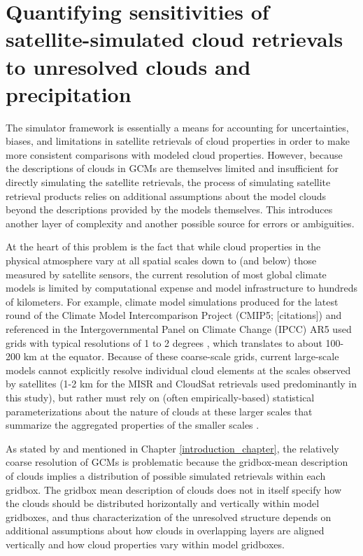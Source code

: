 \chapter{Quantifying sensitivities of satellite-simulated cloud retrievals to unresolved clouds and precipitation}\label{subgrid1_chapter}

The simulator framework is essentially a means for accounting for uncertainties, biases, and limitations in satellite retrievals of cloud properties in order to make more consistent comparisons with modeled cloud properties. However, because the descriptions of clouds in GCMs are themselves limited and insufficient for directly simulating the satellite retrievals, the process of simulating satellite retrieval products relies on additional assumptions about the model clouds beyond the descriptions provided by the models themselves. This introduces another layer of complexity and another possible source for errors or ambiguities.

At the heart of this problem is the fact that while cloud properties in the physical atmosphere vary at all spatial scales down to (and below) those measured by satellite sensors, the current resolution of most global climate models is limited by computational expense and model infrastructure to hundreds of kilometers. For example, climate model simulations produced for the latest round of the Climate Model Intercomparison Project (CMIP5; [citations]) and referenced in the Intergovernmental Panel on Climate Change (IPCC) AR5 used grids with typical resolutions of 1 to 2 degrees \citep{flato_et_al_2013}, which translates to about 100-200 km at the equator. Because of these coarse-scale grids, current large-scale models cannot explicitly resolve individual cloud elements at the scales observed by satellites (1-2 km for the MISR and CloudSat retrievals used predominantly in this study), but rather must rely on (often empirically-based) statistical parameterizations about the nature of clouds at these larger scales that summarize the aggregated properties of the smaller scales \citep{randall_et_al_2003}.

As stated by \cite{pincus_et_al_2012} and mentioned in Chapter \ref{introduction_chapter}, the relatively coarse resolution of GCMs is problematic because the gridbox-mean description of clouds implies a distribution of possible simulated retrievals within each gridbox. The gridbox mean description of clouds does not in itself specify how the clouds should be distributed horizontally and vertically within model gridboxes, and thus characterization of the unresolved structure depends on additional assumptions about how clouds in overlapping layers are aligned vertically and how cloud properties vary within model gridboxes.

